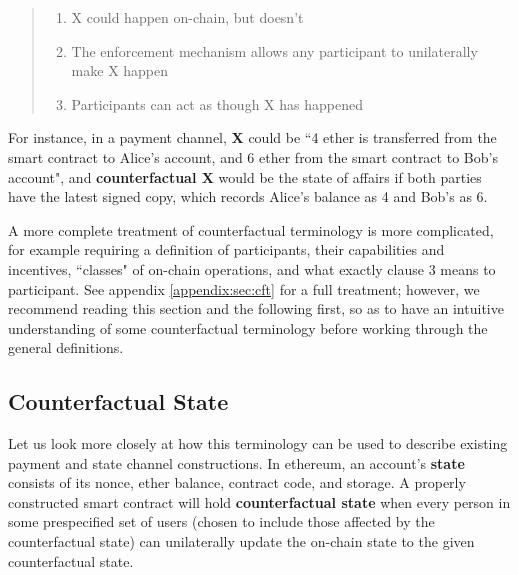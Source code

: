 \documentclass[prb,floatfix,reprint,nofootinbib,amsmath,amssymb,epsfig,pre,floats,letterpaper,groupedaffiliation,tightenlines,allcolors=blue,11pt]{revtex4}
\theoremstyle{definition}
\theoremstyle{definition}
\theoremstyle{definition}
\begin{document}
\begin{quote}
\begin{enumerate}
\item X could happen on-chain, but doesn't
\item The enforcement mechanism allows any participant to unilaterally make X happen
\item Participants can act as though X has happened
\end{enumerate}
\end{quote}

For instance, in a payment channel, \textbf{X} could be ``4 ether is transferred from the smart contract to Alice's account, and 6 ether from the smart contract to Bob's account", and \textbf{counterfactual X} would be the state of affairs if both parties have the latest signed copy, which records Alice's balance as 4 and Bob's as 6.

A more complete treatment of counterfactual terminology is more complicated, for example requiring a definition of participants, their capabilities and incentives, ``classes" of on-chain operations, and what exactly clause 3 means to participant. See appendix \ref{appendix:sec:cft} for a full treatment; however, we recommend reading this section and the following first, so as to have an intuitive understanding of some counterfactual terminology before working through the general definitions.

\subsection{Counterfactual State}

Let us look more closely at how this terminology can be used to describe existing payment and state channel constructions. In ethereum, an account's \textbf{state} consists of its nonce, ether balance, contract code, and storage. A properly constructed smart contract will hold \textbf{counterfactual state} when every person in some prespecified set of users (chosen to include those affected by the counterfactual state) can unilaterally update the on-chain state to the given counterfactual state.
\end{document}
